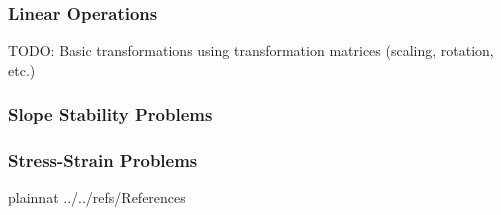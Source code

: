\documentclass[12pt]{article}
\begin{document}
\subsubsection{Linear Operations}
TODO: Basic transformations using transformation matrices (scaling, rotation, etc.)

\subsubsection{Slope Stability Problems}

\subsubsection{Stress-Strain Problems}








\newpage

 {plainnat}
 {../../refs/References}
\end{document}
